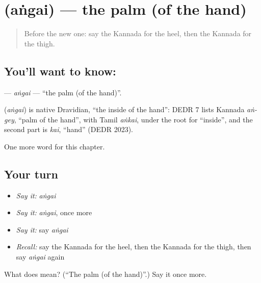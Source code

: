 \section[\texorpdfstring{\kn{ಅಂಗೈ} (aṅgai)}{ಅಂಗೈ (aṅgai)}]{ (aṅgai) — the palm (of the hand)}

\label{lesson:KA-C168-angai}



\begin{quote}
Before the new one: say the Kannada for the heel, then the Kannada for the thigh.
\end{quote}

\subsection*{You'll want to know: }
\textbf{} — \emph{aṅgai} — \textquotedblleft{}the palm (of the hand)\textquotedblright{}.

\begin{cousinweb}
\textbf{} (\emph{aṅgai}) is native Dravidian, \textquotedblleft{}the inside of the hand\textquotedblright{}: DEDR 7 lists Kannada \emph{aṅ-gey}, \textquotedblleft{}palm of the hand\textquotedblright{}, with Tamil \emph{aṅkai}, under the root for \textquotedblleft{}inside\textquotedblright{}, and the second part is \emph{kai}, \textquotedblleft{}hand\textquotedblright{} (DEDR 2023).
\end{cousinweb}

\begin{grammarlens}[title={What you've built}]
One more word for this chapter.
\end{grammarlens}

\subsection*{Your turn}
\begin{itemize}
\raggedright
  \item \emph{Say it:} \emph{aṅgai}
  \item \emph{Say it:} \emph{aṅgai}, once more
  \item \emph{Say it:} say \emph{aṅgai}
  \item \emph{Recall:} say the Kannada for the heel, then the Kannada for the thigh, then say \emph{aṅgai} again
\end{itemize}

\begin{tcolorbox}[breakable,colback=teal!4,colframe=teal!35!black,title={Before you move on}]
What does  mean? (\textquotedblleft{}The palm (of the hand)\textquotedblright{}.) Say it once more.
\end{tcolorbox}

